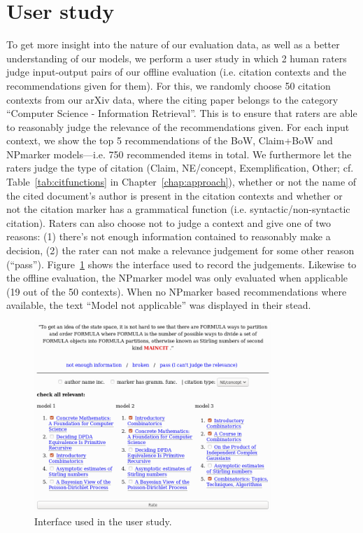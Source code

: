 \section{User study}\label{sec:oneval}
To get more insight into the nature of our evaluation data, as well as a better understanding of our models, we perform a user study in which 2 human raters judge input-output pairs of our offline evaluation (i.e. citation contexts and the recommendations given for them). For this, we randomly choose 50 citation contexts from our arXiv data, where the citing paper belongs to the category ``Computer Science - Information Retrieval''. This is to ensure that raters are able to reasonably judge the relevance of the recommendations given. For each input context, we show the top 5 recommendations of the BoW, Claim+BoW and NPmarker models---i.e. 750 recommended items in total. We furthermore let the raters judge the type of citation (Claim, NE/concept, Exemplification, Other; cf. Table~\ref{tab:citfunctions} in Chapter~\ref{chap:approach}), whether or not the name of the cited document's author is present in the citation contexts and whether or not the citation marker has a grammatical function (i.e. syntactic/non-syntactic citation). Raters can also choose not to judge a context and give one of %
two reasons: (1) there's not enough information contained to reasonably make a decision, %
(2) the rater can not make a relevance judgement for some other reason (``pass''). Figure~\ref{fig:interface} shows the interface used to record the judgements. Likewise to the offline evaluation, the NPmarker model was only evaluated when applicable (19 out of the 50 contexts). When no NPmarker based recommendations where available, the text ``Model not applicable'' was displayed in their stead.


\begin{figure}[t]
  \centering
    \includegraphics[width=0.8\textwidth]{figures/evaluation/interface.png}
  \caption{Interface used in the user study.}
  \label{fig:interface}
\end{figure}

